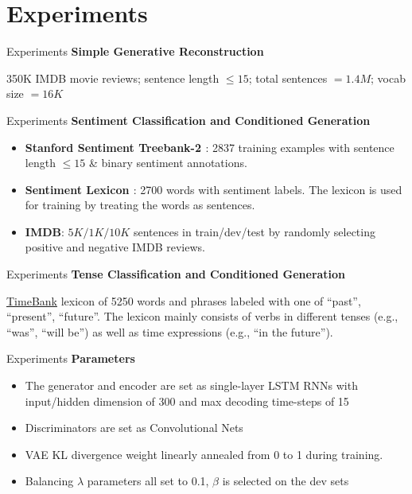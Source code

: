 \documentclass{beamer}
\begin{document}
\section{Experiments}
\begin{frame}{Experiments}
  \textbf{Simple Generative Reconstruction}
  
  350K IMDB movie reviews; sentence length $\leq 15$; total sentences $= 1.4M$; vocab size $= 16K$
\end{frame}

\begin{frame}{Experiments}
  \textbf{Sentiment Classification and Conditioned Generation}
  
  \begin{itemize}
    \item \textbf{Stanford Sentiment Treebank-2 \cite{socher2013recursive}}: 2837 training examples with sentence length $\leq 15$ \& binary sentiment annotations.
    \item \textbf{Sentiment Lexicon \cite{wilson2005recognizing}}:  2700 words with sentiment labels. The lexicon is used for training by treating the words as sentences.
    \item \textbf{IMDB}: $5K/1K/10K$ sentences in train/dev/test by randomly selecting positive and negative IMDB reviews.
  \end{itemize}
  
\end{frame}

\begin{frame}{Experiments}
  \textbf{Tense Classification and Conditioned Generation}
  
  \href{http://timeml.org}{TimeBank} lexicon of 5250 words and phrases labeled with one of {“past”, “present”, “future”}. The lexicon mainly consists of verbs in different tenses (e.g., “was”, “will be”) as well as time expressions (e.g., “in the future”).
\end{frame}

\begin{frame}{Experiments}
  \textbf{Parameters}
  \begin{itemize}
    \item The generator and encoder are set as single-layer LSTM RNNs with input/hidden dimension of 300 and max decoding time-steps of 15
    \item Discriminators are set as Convolutional Nets
    \item VAE KL divergence weight linearly annealed from 0 to 1 during training.
    \item Balancing $\lambda$ parameters all set to 0.1, $\beta$ is selected on the dev sets
  \end{itemize}
\end{frame}
\end{document}
